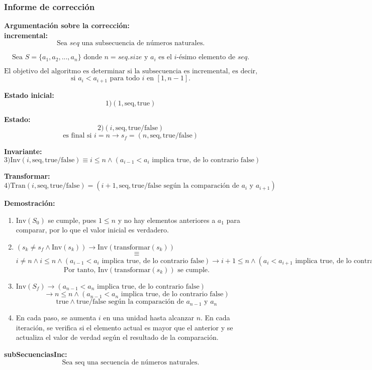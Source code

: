 \documentclass[12pt, a4paper]{article}
\begin{document}
\subsubsection{Informe de corrección}
\textbf{Argumentación sobre la corrección: \\}
\textbf{incremental: } \\
\[ \text{Sea } seq \text{ una subsecuencia de números naturales.} \]

\[ \text{Sea } S = \{a_1, a_2, ..., a_n\} \text{ donde } n = seq.size \text{ y } a_i \text{ es el } i\text{-ésimo elemento de }seq. \]

\[ \text{El objetivo del algoritmo es determinar si la subsecuencia es incremental, es decir,}\] 
\[ \text{si } a_i < a_{i+1} \text{ para todo } i \text{ en } [1, n-1]. \]

\textbf{Estado inicial:}
\[ 1) (1, \text{seq}, \text{true}) \]

\textbf{Estado:}
\[ 2) (i, \text{seq}, \text{true/false}) \]
\[ \text{es final si } i = n \rightarrow s_f = (n, \text{seq}, \text{true/false}) \]

\textbf{Invariante:}
\[ 3) \text{Inv}(i, \text{seq}, \text{true/false}) \equiv i \leq n \land (a_{i-1} < a_i \text{ implica true, de lo contrario false}) \]

\textbf{Transformar:}
\[ 4) \text{Tran}(i, \text{seq}, \text{true/false}) = (i+1, \text{seq}, \text{true/false según la comparación de } a_{i} \text{ y } a_{i+1}) \]

\textbf{Demostración:}

\begin{enumerate}
  \item \( \text{Inv}(S_0) \) se cumple, pues \( 1 \leq n \) y no hay elementos anteriores a \( a_1 \) para comparar, por lo que el valor inicial es verdadero.
  \item \( (s_k \neq s_f \land \text{Inv}(s_k)) \rightarrow \text{Inv}(\text{transformar}(s_k)) \)
  \[\equiv\]
  \( i \neq n \land i \leq n \land (a_{i-1} < a_i \text{ implica true, de lo contrario false}) \rightarrow i+1 \leq n \land (a_i < a_{i+1} \text{ implica true, de lo contrario false}) \)
  \[ \text{Por tanto, } \text{Inv}(\text{transformar}(s_k)) \text{ se cumple.} \]
  \item \( \text{Inv}(S_f) \rightarrow (a_{n-1} < a_n \text{ implica true, de lo contrario false}) \)
  \[\rightarrow n \leq n \land (a_{n-1} < a_n \text{ implica true, de lo contrario false}) \]
  \[ \text{true} \land \text{true/false según la comparación de } a_{n-1} \text{ y } a_n \]
  \item En cada paso, se aumenta \( i \) en una unidad hasta alcanzar \( n \). En cada iteración, se verifica si el elemento actual es mayor que el anterior y se actualiza el valor de verdad según el resultado de la comparación.
\end{enumerate}
\textbf{subSecuenciasInc: } \\
\[ \text{Sea } \text{seq} \text{ una secuencia de números naturales.} \]
\end{document}
